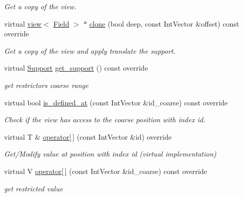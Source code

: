 \begin{DoxyCompactItemize}
\begin{DoxyCompactList}\small\item\em Get a copy of the view. \end{DoxyCompactList}\item 
virtual \hyperlink{classUintah_1_1PhaseField_1_1detail_1_1view}{view}$<$ \hyperlink{structUintah_1_1PhaseField_1_1ScalarField}{Field} $>$ $\ast$ \hyperlink{classUintah_1_1PhaseField_1_1detail_1_1amr__restrictor_3_01ScalarField_3_01T_01_4_00_01Problem_05760ee5d1d3adcc969b3f56f71e72acb_a81b7ca467a9a0f54f9bf37ca18038240}{clone} (bool deep, const Int\+Vector \&offset) const override
\begin{DoxyCompactList}\small\item\em Get a copy of the view and apply translate the support. \end{DoxyCompactList}\item 
virtual \hyperlink{classUintah_1_1PhaseField_1_1Support}{Support} \hyperlink{classUintah_1_1PhaseField_1_1detail_1_1amr__restrictor_3_01ScalarField_3_01T_01_4_00_01Problem_05760ee5d1d3adcc969b3f56f71e72acb_a5b7788432aecb51049ec0fdeefd90519}{get\+\_\+support} () const override
\begin{DoxyCompactList}\small\item\em get restrictor\textquotesingle{}s coarse range \end{DoxyCompactList}\item 
virtual bool \hyperlink{classUintah_1_1PhaseField_1_1detail_1_1amr__restrictor_3_01ScalarField_3_01T_01_4_00_01Problem_05760ee5d1d3adcc969b3f56f71e72acb_acb67236a4a7ecac027655ad592fff4ae}{is\+\_\+defined\+\_\+at} (const Int\+Vector \&id\+\_\+coarse) const override
\begin{DoxyCompactList}\small\item\em Check if the view has access to the coarse position with index id. \end{DoxyCompactList}\item 
virtual T \& \hyperlink{classUintah_1_1PhaseField_1_1detail_1_1amr__restrictor_3_01ScalarField_3_01T_01_4_00_01Problem_05760ee5d1d3adcc969b3f56f71e72acb_a900eab9c5c4f402881b207bb5270ebbc}{operator\mbox{[}$\,$\mbox{]}} (const Int\+Vector \&id) override
\begin{DoxyCompactList}\small\item\em Get/\+Modify value at position with index id (virtual implementation) \end{DoxyCompactList}\item 
virtual V \hyperlink{classUintah_1_1PhaseField_1_1detail_1_1amr__restrictor_3_01ScalarField_3_01T_01_4_00_01Problem_05760ee5d1d3adcc969b3f56f71e72acb_ab29b8c1e68dba955e6062c84adca2ef4}{operator\mbox{[}$\,$\mbox{]}} (const Int\+Vector \&id\+\_\+coarse) const override
\begin{DoxyCompactList}\small\item\em get restricted value \end{DoxyCompactList}\end{DoxyCompactItemize}
